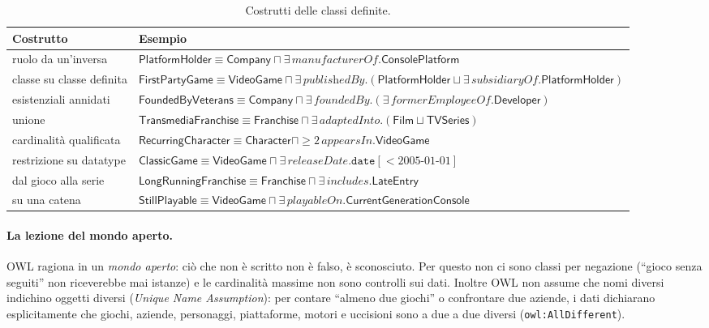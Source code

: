 \documentclass[10pt,a4paper]{article}
\newcommand{\cls}[1]{\textsf{#1}}
\newcommand{\prop}[1]{\textit{#1}}
\begin{document}
\begin{table}[htbp]\centering\small
\begin{tabularx}{\linewidth}{@{}lY@{}}
\toprule
Costrutto & Esempio \\
\midrule
ruolo da un'inversa & $\cls{PlatformHolder} \equiv \cls{Company} \sqcap \exists\,\prop{manufacturerOf}.\cls{ConsolePlatform}$ \\
classe su classe definita & $\cls{FirstPartyGame} \equiv \cls{VideoGame} \sqcap \exists\,\prop{publishedBy}.(\cls{PlatformHolder} \sqcup \exists\,\prop{subsidiaryOf}.\cls{PlatformHolder})$ \\
esistenziali annidati & $\cls{FoundedByVeterans} \equiv \cls{Company} \sqcap \exists\,\prop{foundedBy}.(\exists\,\prop{formerEmployeeOf}.\cls{Developer})$ \\
unione & $\cls{TransmediaFranchise} \equiv \cls{Franchise} \sqcap \exists\,\prop{adaptedInto}.(\cls{Film} \sqcup \cls{TVSeries})$ \\
cardinalità qualificata & $\cls{RecurringCharacter} \equiv \cls{Character} \sqcap {\geq}2\,\prop{appearsIn}.\cls{VideoGame}$ \\
restrizione su datatype & $\cls{ClassicGame} \equiv \cls{VideoGame} \sqcap \exists\,\prop{releaseDate}.\texttt{date}[<2005\text{-}01\text{-}01]$ \\
dal gioco alla serie & $\cls{LongRunningFranchise} \equiv \cls{Franchise} \sqcap \exists\,\prop{includes}.\cls{LateEntry}$ \\
su una catena & $\cls{StillPlayable} \equiv \cls{VideoGame} \sqcap \exists\,\prop{playableOn}.\cls{CurrentGenerationConsole}$ \\
\bottomrule
\end{tabularx}
\caption{Costrutti delle classi definite.}\label{tab:costrutti}
\end{table}

\paragraph{La lezione del mondo aperto.} OWL ragiona in un \emph{mondo aperto}: ciò che non è scritto non è falso, è sconosciuto. Per questo non ci sono classi per negazione (``gioco senza seguiti'' non riceverebbe mai istanze) e le cardinalità massime non sono controlli sui dati. Inoltre OWL non assume che nomi diversi indichino oggetti diversi (\emph{Unique Name Assumption}): per contare ``almeno due giochi'' o confrontare due aziende, i dati dichiarano esplicitamente che giochi, aziende, personaggi, piattaforme, motori e uccisioni sono a due a due diversi (\texttt{owl:AllDifferent}).
\end{document}
